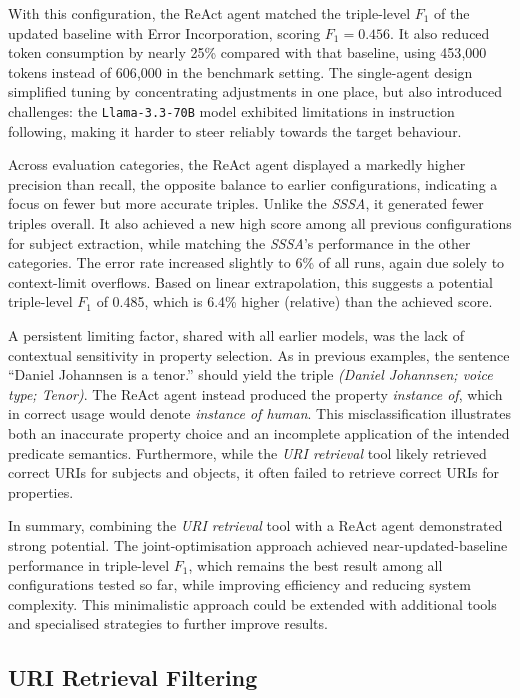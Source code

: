 \documentclass[a4paper,oneside,bibliography=totoc]{scrbook}
\begin{document}
With this configuration, the ReAct agent matched the triple-level $F_{1}$ of the updated baseline with Error Incorporation, scoring $F_{1}=0.456$. It also reduced token consumption by nearly 25\% compared with that baseline, using 453{,}000 tokens instead of 606{,}000 in the benchmark setting. The single-agent design simplified tuning by concentrating adjustments in one place, but also introduced challenges: the \texttt{Llama-3.3-70B} model exhibited limitations in instruction following, making it harder to steer reliably towards the target behaviour.

Across evaluation categories, the ReAct agent displayed a markedly higher precision than recall, the opposite balance to earlier configurations, indicating a focus on fewer but more accurate triples. Unlike the \textit{\ac{SSSA}}, it generated fewer triples overall. It also achieved a new high score among all previous configurations for subject extraction, while matching the \textit{\ac{SSSA}}’s performance in the other categories. The error rate increased slightly to 6\% of all runs, again due solely to context-limit overflows. Based on linear extrapolation, this suggests a potential triple-level $F_{1}$ of 0.485, which is 6.4\% higher (relative) than the achieved score.

A persistent limiting factor, shared with all earlier models, was the lack of contextual sensitivity in property selection. As in previous examples, the sentence \enquote{Daniel Johannsen is a tenor.} should yield the triple \textit{(Daniel Johannsen; voice type; Tenor)}. The ReAct agent instead produced the property \textit{instance of}, which in correct usage would denote \textit{instance of human}. This misclassification illustrates both an inaccurate property choice and an incomplete application of the intended predicate semantics. Furthermore, while the \textit{\ac{URI} retrieval} tool likely retrieved correct \acp{URI} for subjects and objects, it often failed to retrieve correct \acp{URI} for properties.

In summary, combining the \textit{\ac{URI} retrieval} tool with a ReAct agent demonstrated strong potential. The joint-optimisation approach achieved near-updated-baseline performance in triple-level $F_{1}$, which remains the best result among all configurations tested so far, while improving efficiency and reducing system complexity. This minimalistic approach could be extended with additional tools and specialised strategies to further improve results.

\subsection{URI Retrieval Filtering}
\label{subsec:uri_retrieval_filtering}
\end{document}
